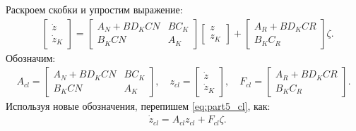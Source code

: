 Раскроем скобки и упростим выражение:
\begin{align}
	\label{eq:part5_cl}
	&\begin{bmatrix}
		{\dot{z}} \\ {\dot{z}}_K 
	\end{bmatrix}
	=
	\begin{bmatrix}
		{A}_N + {B}{D}_K{C}{N} & {B}{C}_K \\
		{B}_K{C}{N} &{A}_K
	\end{bmatrix}
	\begin{bmatrix}
		{z} \\ {z}_K 
	\end{bmatrix}
	+
	\begin{bmatrix}
		{A}_R + {B}{D}_K{C}{R}\\ {B}_K{C}_R
	\end{bmatrix}
	{\zeta}.
\end{align}
Обозначим:
\begin{align}
	{A}_{cl} = \begin{bmatrix}
		{A}_N + {B}{D}_K{C}{N} & {B}{C}_K \\
		{B}_K{C}{N} & {A}_K
	\end{bmatrix},
	\quad
	{z}_{cl} = \begin{bmatrix}
		{\dot{z}} \\ {\dot{z}}_K 
	\end{bmatrix},
	\quad
	{F}_{cl} = \begin{bmatrix}
		{A}_R + {B}{D}_K{C}{R}\\ {B}_K{C}_R
	\end{bmatrix}.
\end{align}
Используя новые обозначения, перепишем \eqref{eq:part5_cl}, как:
\begin{align}
	\label{eq:part5_system}
	&{\dot{z}}_{cl} = {A}_{cl} {z}_{cl}+ {F}_{cl}\zeta.
\end{align}
